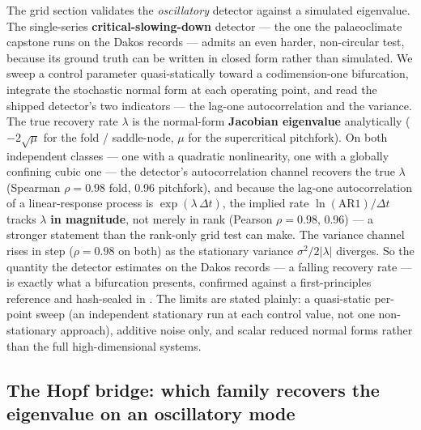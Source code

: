 \documentclass[11pt]{article}
\begin{document}
The grid section validates the \emph{oscillatory} detector against a
simulated eigenvalue. The single-series \textbf{critical-slowing-down}
detector --- the one the palaeoclimate capstone runs on the Dakos
records --- admits an even harder, non-circular test, because its ground
truth can be written in closed form rather than simulated. We sweep a
control parameter quasi-statically toward a codimension-one bifurcation,
integrate the stochastic normal form at each operating point, and read
the shipped detector's two indicators --- the lag-one autocorrelation
and the variance. The true recovery rate $\lambda$ is the normal-form
\textbf{Jacobian eigenvalue} analytically ($-2\sqrt{\mu}$ for the fold /
saddle-node, $\mu$ for the supercritical pitchfork). On both independent
classes --- one with a quadratic nonlinearity, one with a globally
confining cubic one --- the detector's autocorrelation channel recovers
the true $\lambda$ (Spearman $\rho = 0.98$ fold, 0.96 pitchfork), and
because the lag-one autocorrelation of a linear-response process is
$\exp(\lambda \, \Delta t)$, the implied rate $\ln(\mathrm{AR1})/\Delta t$
tracks $\lambda$ \textbf{in magnitude}, not merely in rank (Pearson
$\rho = 0.98$, 0.96) --- a stronger statement than the rank-only grid
test can make. The variance channel rises in step ($\rho = 0.98$ on
both) as the stationary variance $\sigma^2/2|\lambda|$ diverges. So the
quantity the detector estimates on the Dakos records --- a falling
recovery rate --- is exactly what a bifurcation presents, confirmed
against a first-principles reference and hash-sealed in
.
The limits are stated plainly: a quasi-static per-point sweep (an
independent stationary run at each control value, not one
non-stationary approach), additive noise only, and scalar reduced normal
forms rather than the full high-dimensional systems.

\subsection{The Hopf bridge: which family recovers the eigenvalue on an
oscillatory mode}\label{sec:hopf}
\end{document}
